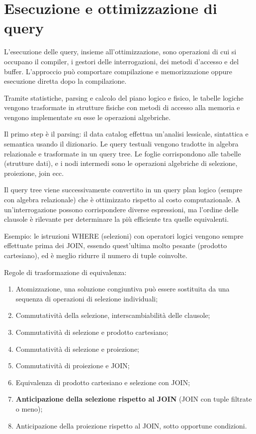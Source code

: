 \section{Esecuzione e ottimizzazione di query}
L'esecuzione delle query, insieme all'ottimizzazione, sono operazioni di cui si occupano il compiler, i gestori delle interrogazioni, dei metodi d'accesso e del buffer. L'approccio può comportare compilazione e memorizzazione oppure esecuzione diretta dopo la compilazione. 

Tramite statistiche, parsing e calcolo del piano logico e fisico, le tabelle logiche vengono trasformate in strutture fisiche con metodi di accesso alla memoria e vengono implementate su esse le operazioni algebriche.

Il primo step è il parsing: il data catalog effettua un'analisi lessicale, sintattica e semantica usando il dizionario. Le query testuali vengono tradotte in algebra relazionale e trasformate in un query tree. Le foglie corrispondono alle tabelle (strutture dati), e i nodi intermedi sono le operazioni algebriche di selezione, proiezione, join ecc.

Il query tree viene successivamente convertito in un query plan logico (sempre con algebra relazionale) che è ottimizzato rispetto al costo computazionale. A un'interrogazione possono corrispondere diverse espressioni, ma l'ordine delle clausole è rilevante per determinare la più efficiente tra quelle equivalenti.

Esempio: le istruzioni WHERE (selezioni) con operatori logici vengono sempre effettuate prima dei JOIN, essendo quest'ultima molto pesante (prodotto cartesiano), ed è meglio ridurre il numero di tuple coinvolte.

Regole di trasformazione di equivalenza:
\begin{enumerate}
	\item Atomizzazione, una soluzione congiuntiva può essere sostituita da una sequenza di operazioni di selezione individuali;
	\item Commutatività della selezione, interscambiabilità delle clausole;
	\item Commutatività di selezione e prodotto cartesiano;
	\item Commutatività di selezione e proiezione;
	\item Commutatività di proiezione e JOIN;
	\item Equivalenza di prodotto cartesiano e selezione con JOIN;
	\item \textbf{Anticipazione della selezione rispetto al JOIN} (JOIN con tuple filtrate o meno);
	\item Anticipazione della proiezione rispetto al JOIN, sotto opportune condizioni.
\end{enumerate}

